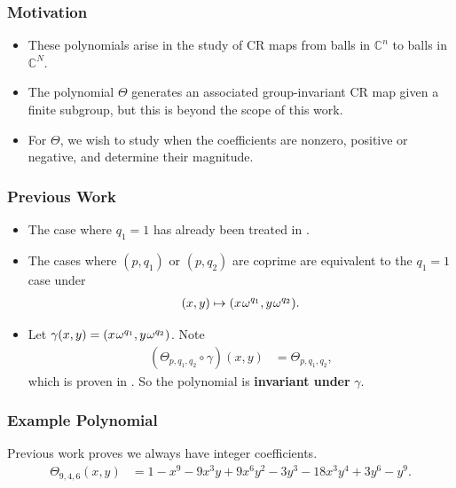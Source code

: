 \documentclass{beamer}
\theoremstyle{plain}
\theoremstyle{definition}
\theoremstyle{remark}
\renewcommand{\c}{\mathbb{C}}			%
\newcommand{\bee}{\begin{equation}\begin{aligned}}
\newcommand{\eee}{\end{aligned}\end{equation}}
\renewcommand{\'}{\hspace{0.5mm}'}		%
\begin{document}

\begin{frame}
\frametitle{Motivation}

\begin{itemize}
	\item These polynomials arise in the study of 
	CR maps from balls in $\c^n$ to balls in $\c^N$. 
	\item The polynomial $\Theta$ generates an
	associated group-invariant 
	CR map given a finite subgroup, but this is beyond the scope
	of this work. 
	\item For $\Theta$, we wish to study when the coefficients
	are nonzero, positive or negative,
	and determine their magnitude. 
\end{itemize}



\end{frame}


\begin{frame}
\frametitle{Previous Work}

\begin{itemize}
	\item The case where $q_1 = 1$ has already been treated in 
			\cite{Loehr2004}. 
	\item The cases where $(p,q_1)$ or $(p,q_2)$ are coprime
	are equivalent to the $q_1 = 1$ case under
	\bee
		(x,y) \mapsto 
		(x \hspace{0.25mm}\omega^{q_1}, 
		y\hspace{0.25mm}\omega^{q_2}). 
	\eee
	
	\item Let $\gamma(x,y) = (x \hspace{0.25mm}\omega^{q_1}, 
		y\hspace{0.25mm}\omega^{q_2})$. 
	Note
	\bee
		(\Theta_{p,q_1,q_2} \circ \gamma)(x,y) 
		&=
			\Theta_{p,q_1,q_2},
	\eee
	which is proven in \cite{DAngelo1992}. 
	So the polynomial is 
	\textbf{invariant under} $\gamma$. 
\end{itemize}



\end{frame}


\begin{frame}
\frametitle{Example Polynomial}

\begin{block}{Previous work proves we always have integer coefficients. }
\bee
	\Theta_{9,4,6}(x,y) &= 1 - x^9 - 9 x^3 y + 9 x^6 y^2 - 3 y^3 - 18 x^3 y^4 + 3 y^6 - y^9. 
\eee
\end{block}

\end{frame}
\end{document}
